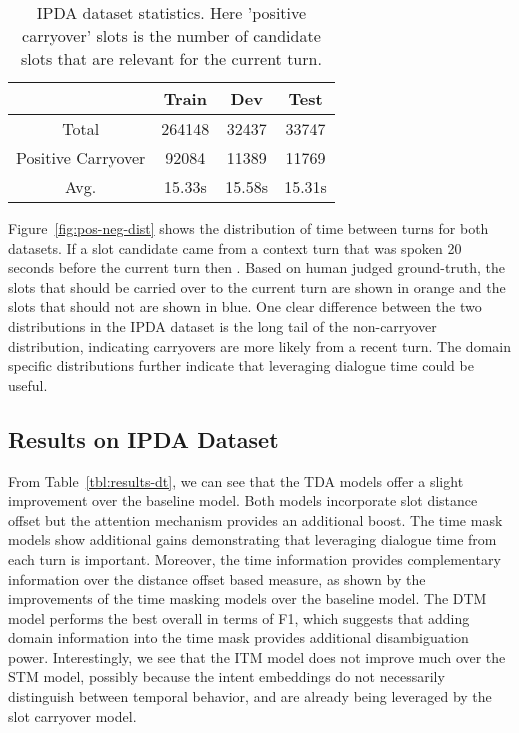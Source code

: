 \documentclass[11pt,a4paper]{article}
\begin{document}
\begin{table}[ht]
\small
\begin{center}
\begin{tabular}{|c||c|c|c|} \hline
& Train & Dev & Test \\\hline
Total & 264148 & 32437 & 33747 \\\hline
Positive Carryover & 92084 & 11389 & 11769 \\\hline
Avg.  & 15.33s & 15.58s & 15.31s \\\hline
\end{tabular}
\end{center}
\caption{
IPDA dataset statistics. Here 'positive carryover' slots is the number of candidate slots that are relevant for the current turn.
}
\label{tbl:data}
\end{table}
Figure~\ref{fig:pos-neg-dist} shows the distribution of time between turns for both datasets.
If a slot candidate came from a context turn that was spoken 20 seconds before the current turn then .
Based on human judged ground-truth, the slots that should be carried over to the current turn are shown in orange and the slots that should not are shown in blue.
One clear difference between the two distributions in the IPDA dataset is the long tail of the non-carryover distribution, indicating carryovers are more likely from a recent turn.
The domain specific distributions further indicate that leveraging dialogue time could be useful.

\begin{figure*}[ht]
\centering
{}
\vspace{-0.3cm}
\caption{
Distribution of temporal distance, , for all candidate slots. The ``Carryover Slots", shown in orange, represent slot candidates found in the context that \textit{should} be carried over to the current turn.
}
\label{fig:pos-neg-dist}
\end{figure*}


\subsection{Results on IPDA Dataset}
\label{ssec:results}
From Table~\ref{tbl:results-dt}, we can see that the TDA models offer a slight improvement over the baseline model.
Both models incorporate slot distance offset but the attention mechanism provides an additional boost.
The time mask models show additional gains demonstrating that leveraging dialogue time from each turn is important.
Moreover, the time information provides complementary information over the distance offset based measure, as shown by the improvements of the time masking models over the baseline model.
The DTM model performs the best overall in terms of F1, which suggests that adding domain information into the time mask provides additional disambiguation power.
Interestingly, we see that the ITM model does not improve much over the STM model, possibly because the intent embeddings do not necessarily distinguish between temporal behavior, and are already being leveraged by the slot carryover model. 
\end{document}
